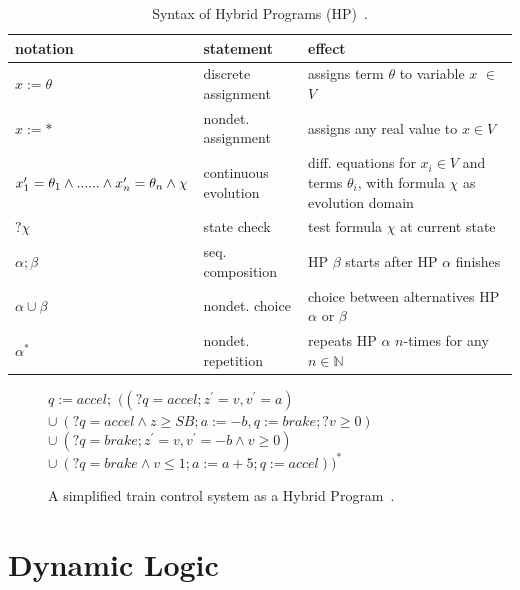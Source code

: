 \begin{table}
	\begin{tabular}{p{5cm} | p{4cm} | p{6cm} }
		notation & statement & effect \\ \hline
		\(x := \theta\) & discrete assignment & assigns term \(\theta\) to variable \(x\) \(\in\) \(V\) \\
		\(x := \ast\) & nondet. assignment & assigns any real value to \(x \in V\) \\
		\(x^{\prime}_1 = \theta_1 \wedge ... \newline
		... \wedge x^{\prime}_n = \theta_n \wedge \chi\) & continuous evolution & diff. equations for \(x_i \in V\) and terms \(\theta_i\),\newline
		with formula \(\chi\) as evolution domain \\
		\(?\chi\) & state check & test formula \(\chi\) at current state \\
		\(\alpha;\beta\) & seq. composition & HP \(\beta\) starts after HP \(\alpha\) finishes \\
		\(\alpha \cup \beta\) & nondet. choice & choice between alternatives HP \(\alpha\) or \(\beta\) \\
		\(\alpha^\ast\) & nondet. repetition & repeats HP \(\alpha\) \(n\)-times for any \(n \in \mathbb{N}\) \\
	\end{tabular}
	\caption{Syntax of Hybrid Programs (HP)~\cite{platzer2010b}.}
	\label{tab:hp}
\end{table}

\begin{figure}[ht!]
	\(q := accel;\)\newline
	\(((?q = accel; z^{\prime}= v, v^{\prime}= a)\) \newline
	\(\cup~(?q = accel \wedge z \geq SB; a := -b, q:= brake; ?v \geq 0)\) \newline
	\(\cup~(?q = brake; z^{\prime}=v, v^{\prime}= -b \wedge v \geq 0)\) \newline
	\(\cup~(?q = brake \wedge v \leq 1; a := a+5; q := accel))^\ast\)
	\caption{A simplified train control system as a Hybrid Program~\cite{platzer2010b}.}
	\label{fig:etcs_hp}
\end{figure}

\section{Dynamic Logic}
\label{sec:pre:DL}

